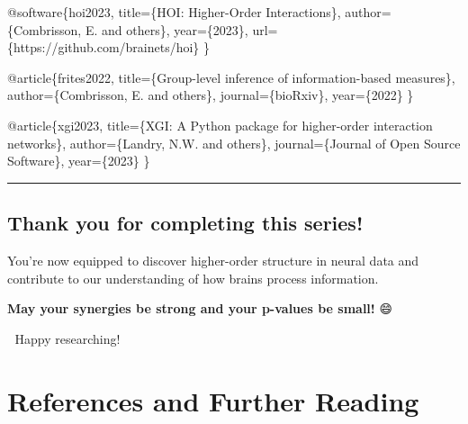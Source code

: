 \documentclass[
  11pt,
  letterpaper,
  oneside,
  openany]{book}
\newenvironment{Shaded}{\begin{snugshade}}{\end{snugshade}}
\newcommand{\CommentTok}[1]{\textcolor[rgb]{0.37,0.37,0.37}{#1}}
\newcommand{\DataTypeTok}[1]{\textcolor[rgb]{0.68,0.00,0.00}{#1}}
\newcommand{\NormalTok}[1]{\textcolor[rgb]{0.00,0.23,0.31}{#1}}
\newcommand{\OtherTok}[1]{\textcolor[rgb]{0.00,0.23,0.31}{#1}}
\newcommand{\VariableTok}[1]{\textcolor[rgb]{0.07,0.07,0.07}{#1}}
\begin{document}
\begin{Shaded}
\begin{Highlighting}[]
\CommentTok{@software\{hoi2023,}
\CommentTok{  title=\{HOI: Higher{-}Order Interactions\},}
\CommentTok{  author=\{Combrisson, E. and others\},}
\CommentTok{  year=\{2023\},}
\CommentTok{  url=\{https://github.com/brainets/hoi\}}
\CommentTok{\}}

\VariableTok{@article}\NormalTok{\{}\OtherTok{frites2022}\NormalTok{,}
  \DataTypeTok{title}\NormalTok{=\{Group{-}level inference of information{-}based measures\},}
  \DataTypeTok{author}\NormalTok{=\{Combrisson, E. and others\},}
  \DataTypeTok{journal}\NormalTok{=\{bioRxiv\},}
  \DataTypeTok{year}\NormalTok{=\{2022\}}
\NormalTok{\}}

\VariableTok{@article}\NormalTok{\{}\OtherTok{xgi2023}\NormalTok{,}
  \DataTypeTok{title}\NormalTok{=\{XGI: A Python package for higher{-}order interaction networks\},}
  \DataTypeTok{author}\NormalTok{=\{Landry, N.W. and others\},}
  \DataTypeTok{journal}\NormalTok{=\{Journal of Open Source Software\},}
  \DataTypeTok{year}\NormalTok{=\{2023\}}
\NormalTok{\}}
\end{Highlighting}
\end{Shaded}

\begin{center}\rule{0.5\linewidth}{0.5pt}\end{center}

\section{Thank you for completing this series!
🎉}\label{thank-you-for-completing-this-series}

You're now equipped to discover higher-order structure in neural data
and contribute to our understanding of how brains process information.

\textbf{May your synergies be strong and your p-values be small!} 😄

🧠 Happy researching! 🚀


\chapter*{References and Further
Reading}\label{references-and-further-reading}

\end{document}
